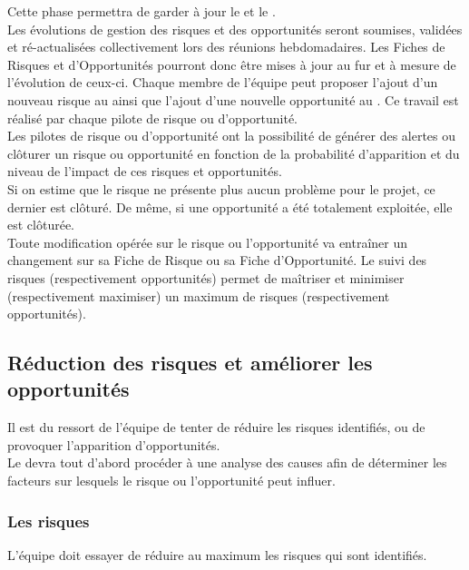 Cette phase permettra de garder à jour le \PR{} et le \PO. \\

Les évolutions de gestion des risques et des opportunités seront soumises, validées et ré-actualisées collectivement lors des réunions hebdomadaires. Les Fiches de Risques et d'Opportunités pourront donc être mises à jour au fur et à mesure de l'évolution de ceux-ci. Chaque membre de l'équipe \PICCourt{} peut proposer l'ajout d'un nouveau risque au \PR{} ainsi que l'ajout d'une nouvelle opportunité au \PO. Ce travail est réalisé par chaque pilote de risque ou d'opportunité.\\

Les pilotes de risque ou d’opportunité ont la possibilité de générer des alertes ou clôturer un risque ou opportunité en fonction de la probabilité d’apparition et du niveau de l’impact de ces risques et opportunités.\\

Si on estime que le risque ne présente plus aucun problème pour le projet, ce dernier est clôturé. De même, si une opportunité a été totalement exploitée, elle est clôturée.\\

Toute modification opérée sur le risque ou l'opportunité va entraîner un changement sur sa Fiche de Risque ou sa Fiche d'Opportunité. Le suivi des risques (respectivement opportunités) permet de maîtriser et minimiser (respectivement maximiser) un maximum de risques (respectivement opportunités). 

\subsection{Réduction des risques et améliorer les opportunités}
\label{reduction_risques_opportunitees}

Il est du ressort de l’équipe de tenter de réduire les risques identifiés, ou de provoquer l’apparition d’opportunités.\\

Le \PICCourt devra tout d’abord procéder à une analyse des causes afin de déterminer les facteurs sur lesquels le risque ou l’opportunité peut influer. \\

\subsubsection*{Les risques}

L'équipe \PICCourt doit essayer de réduire au maximum les risques qui sont identifiés. \\

